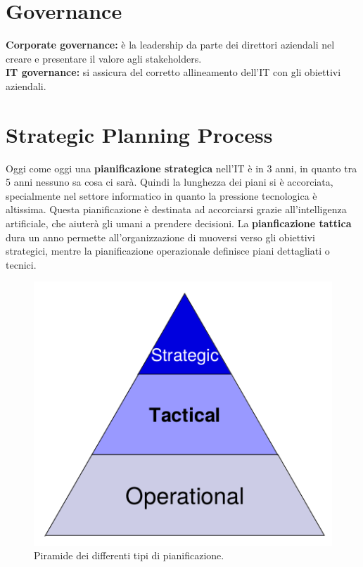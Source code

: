 \section{Governance}

\textbf{Corporate governance:} è la leadership da parte dei direttori aziendali nel 
creare e presentare il valore agli stakeholders.\\
\newline
\textbf{IT governance:} si assicura del corretto allineamento dell'IT con gli 
obiettivi aziendali.



\section{Strategic Planning Process}
\label{PG:SPP}

Oggi come oggi una \textbf{pianificazione strategica} nell'IT è in 3 anni, in quanto tra 
5 anni nessuno sa cosa ci sarà. Quindi la lunghezza dei piani si è accorciata, 
specialmente nel settore informatico in quanto la pressione tecnologica è 
altissima. Questa pianificazione è destinata ad accorciarsi grazie 
all'intelligenza artificiale, che aiuterà gli umani a prendere decisioni.
La \textbf{pianficazione tattica} dura un anno permette all'organizzazione di 
muoversi verso gli obiettivi strategici, mentre la pianificazione operazionale 
definisce piani dettagliati o tecnici.

\begin{figure}[h!]
        \begin{center}
                \includegraphics[scale=0.6]{res/img/planning_process}
        \end{center}
        \caption{Piramide dei differenti tipi di pianificazione.}    
\end{figure}

